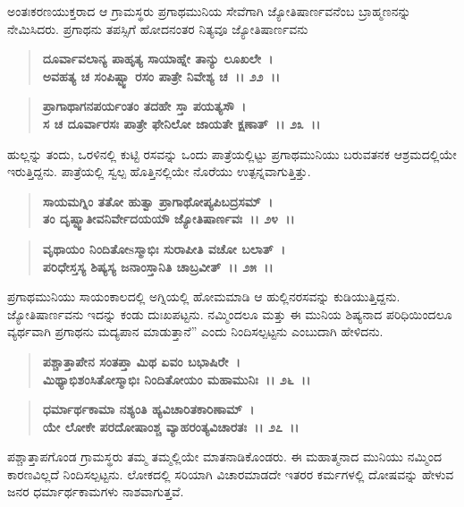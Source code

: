 ಅಂತಃಕರಣಯುಕ್ತರಾದ ಆ ಗ್ರಾಮಸ್ಥರು ಪ್ರಗಾಥಮುನಿಯ ಸೇವೆಗಾಗಿ ಜ್ಯೋತಿಷಾರ್ಣವನೆಂಬ ಬ್ರಾಹ್ಮಣನನ್ನು ನೇಮಿಸಿದರು. ಪ್ರಗಾಥನು ತಪಸ್ಸಿಗೆ ಹೋದನಂತರ ನಿತ್ಯವೂ ಜ್ಯೋತಿಷಾರ್ಣವನು

\begin{verse}
\textbf{ದೂರ್ವಾವಲಾನ್ಯ ಪಾಹೃತ್ಯ ಸಾಯಾಹ್ನೇ ತಾನ್ಯು ಲೂಖಲೇ~।}\\\textbf{ಅವಹತ್ಯ ಚ ಸಂಪಿಷ್ಟ್ವಾ ರಸಂ ಪಾತ್ರೇ ನಿವೇಶ್ಯ ಚ~।। ೨೨~।।}
\end{verse}

\begin{verse}
\textbf{ಪ್ರಾಗಾಥಾಗನಪರ್ಯಂತಂ ತದಹೇ ಸ್ತಾ ಪಯತ್ಯಸೌ~।}\\\textbf{ಸ ಚ ದೂರ್ವಾರಸಃ ಪಾತ್ರೇ ಫೇನಿಲೋ ಜಾಯತೇ ಕ್ಷಣಾತ್~।। ೨೩~।।}
\end{verse}

ಹುಲ್ಲನ್ನು ತಂದು, ಒರಳಿನಲ್ಲಿ ಕುಟ್ಟಿ ರಸವನ್ನು ಒಂದು ಪಾತ್ರೆಯಲ್ಲಿಟ್ಟು ಪ್ರಗಾಥಮುನಿಯು ಬರುವತನಕ ಆಶ್ರಮದಲ್ಲಿಯೇ ಇರುತ್ತಿದ್ದನು. ಪಾತ್ರೆಯಲ್ಲಿ ಸ್ವಲ್ಪ ಹೊತ್ತಿನಲ್ಲಿಯೇ ನೊರೆಯು ಉತ್ಪನ್ನವಾಗುತ್ತಿತ್ತು.

\begin{verse}
\textbf{ಸಾಯಮಗ್ನಿಂ ತತೋ ಹುತ್ವಾ ಪ್ರಾಗಾಥೋಪ್ಯಪಿಬದ್ರಸಮ್~।}\\\textbf{ತಂ ದೃಷ್ಟ್ವಾತೀವನಿರ್ವೇದಯಯೌ ಜ್ಯೋತಿಷಾರ್ಣವಃ~।। ೨೪~।। }
\end{verse}

\begin{verse}
\textbf{ವೃಥಾಯಂ ನಿಂದಿತೋsಸ್ಮಾಭಿಃ ಸುರಾಪೀತಿ ವಚೋ ಬಲಾತ್~।}\\\textbf{ಪರಿಧೇಸ್ತಸ್ಯ ಶಿಷ್ಯಸ್ಯ ಜನಾಂಸ್ತಾನಿತಿ ಚಾಬ್ರವೀತ್~।। ೨೫~।।}
\end{verse}

ಪ್ರಗಾಥಮುನಿಯು ಸಾಯಂಕಾಲದಲ್ಲಿ ಅಗ್ನಿಯಲ್ಲಿ ಹೋಮಮಾಡಿ ಆ ಹುಲ್ಲಿನರಸವನ್ನು ಕುಡಿಯುತ್ತಿದ್ದನು. ಜ್ಯೋತಿಷಾರ್ಣವನು ಇದನ್ನು ಕಂಡು ದುಃಖಪಟ್ಟನು. ನಮ್ಮಿಂದಲೂ ಮತ್ತು ಈ ಮುನಿಯ ಶಿಷ್ಯನಾದ ಪರಿಧಿಯಿಂದಲೂ ವ್ಯರ್ಥವಾಗಿ ಪ್ರಗಾಥನು ಮದ್ಯಪಾನ ಮಾಡುತ್ತಾನೆ” ಎಂದು ನಿಂದಿಸಲ್ಪಟ್ಟನು ಎಂಬುದಾಗಿ ಹೇಳಿದನು.

\begin{verse}
\textbf{ಪಶ್ಚಾತ್ತಾಪೇನ ಸಂತಪ್ತಾ ಮಿಥ ಏವಂ ಬಭಾಷಿರೇ~।}\\\textbf{ಮಿಥ್ಯಾಭಿಶಂಸಿತೋಸ್ಮಾಭಿಃ ನಿಂದಿತೋಯಂ ಮಹಾಮುನಿಃ~।। ೨೬~।।} 
\end{verse}

\begin{verse}
\textbf{ಧರ್ಮಾರ್ಥಕಾಮಾ ನಶ್ಯಂತಿ ಹ್ಯವಿಚಾರಿತಕಾರಿಣಾಮ್~।}\\\textbf{ಯೇ ಲೋಕೇ ಪರದೋಷಾಂಶ್ಚ ವ್ಯಾಹರಂತ್ಯವಿಚಾರತಃ~।। ೨೭~।।}
\end{verse}

ಪಶ್ಚಾತ್ತಾಪಗೊಂಡ ಗ್ರಾಮಸ್ಥರು ತಮ್ಮ ತಮ್ಮಲ್ಲಿಯೇ ಮಾತನಾಡಿಕೊಂಡರು. ಈ ಮಹಾತ್ಮನಾದ ಮುನಿಯು ನಮ್ಮಿಂದ ಕಾರಣವಿಲ್ಲದೆ ನಿಂದಿಸಲ್ಪಟ್ಟನು. ಲೋಕದಲ್ಲಿ ಸರಿಯಾಗಿ ವಿಚಾರಮಾಡದೇ ಇತರರ ಕರ್ಮಗಳಲ್ಲಿ ದೋಷವನ್ನು ಹೇಳುವ ಜನರ ಧರ್ಮಾರ್ಥಕಾಮಗಳು ನಾಶವಾಗುತ್ತವೆ.

